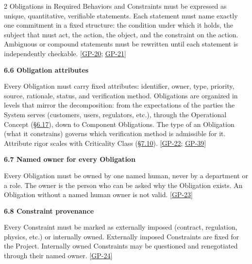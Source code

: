 \begin{multicols}{2}
Obligations in Required Behaviors and Constraints must be expressed as unique, quantitative, verifiable statements. Each statement must name exactly one commitment in a fixed structure: the condition under which it holds, the subject that must act, the action, the object, and the constraint on the action. Ambiguous or compound statements must be rewritten until each statement is independently checkable. [\hyperlink{gp-20}{GP-20}; \hyperlink{gp-21}{GP-21}]

\hypertarget{nss-6.6}{}

\par\smallskip\noindent\textbf{6.6 Obligation attributes}\par\nopagebreak

Every Obligation must carry fixed attributes: identifier, owner, type, priority, source, rationale, status, and verification method. Obligations are organized in levels that mirror the decomposition: from the expectations of the parties the System serves (customers, users, regulators, etc.), through the Operational Concept (\hyperlink{nss-6.17}{\S6.17}), down to Component Obligations. The type of an Obligation (what it constrains) governs which verification method is admissible for it. Attribute rigor scales with Criticality Class (\hyperlink{nss-7.10}{\S7.10}). [\hyperlink{gp-22}{GP-22}; \hyperlink{gp-39}{GP-39}]

\hypertarget{nss-6.7}{}

\par\smallskip\noindent\textbf{6.7 Named owner for every Obligation}\par\nopagebreak

Every Obligation must be owned by one named human, never by a department or a role. The owner is the person who can be asked why the Obligation exists. An Obligation without a named human owner is not valid. [\hyperlink{gp-23}{GP-23}]

\hypertarget{nss-6.8}{}

\par\smallskip\noindent\textbf{6.8 Constraint provenance}\par\nopagebreak

Every Constraint must be marked as externally imposed (contract, regulation, physics, etc.) or internally owned. Externally imposed Constraints are fixed for the Project. Internally owned Constraints may be questioned and renegotiated through their named owner. [\hyperlink{gp-24}{GP-24}]

\hypertarget{nss-6.9}{}


\end{multicols}

